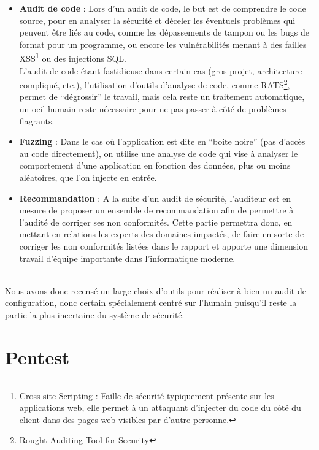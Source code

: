 \documentclass[a4paper]{memoir}
\begin{document}
\begin{itemize}
\item \textbf{Audit de code} : Lors d'un audit de code, le but est de comprendre le code source, pour en analyser la sécurité et déceler les éventuels problèmes qui peuvent être liés au code, comme les dépassements de tampon ou les bugs de format pour un programme, ou encore les vulnérabilités menant à des failles XSS\footnote{Cross-site Scripting : Faille de sécurité typiquement présente sur les applications web, elle permet à un attaquant d'injecter du code du côté du client dans des pages web visibles par d'autre personne.} ou des injections SQL.\\
\noindent L'audit de code étant fastidieuse dans certain cas (gros projet, architecture compliqué, etc.), l'utilisation d'outils d'analyse de code, comme RATS\footnote{Rought Auditing Tool for Security}, permet de ``dégrossir'' le travail, mais cela reste un traitement automatique, un oeil humain reste nécessaire pour ne pas passer à côté de problèmes flagrants.\\

\item \textbf{Fuzzing} : Dans le cas où l'application est dite en ``boite noire'' (pas d'accès au code directement), on utilise une analyse de code qui vise à analyser le comportement d'une application en fonction des données, plus ou moins aléatoires, que l'on injecte en entrée.\\

\item \textbf{Recommandation} : A la suite d'un audit de sécurité, l'auditeur est en mesure de proposer un ensemble de recommandation afin de permettre à l'audité de corriger ses non conformités. Cette partie permettra donc, en mettant en relations les experts des domaines impactés, de faire en sorte de corriger les non conformités listées dans le rapport et apporte une dimension travail d'équipe importante dans l'informatique moderne.\\\\
\end{itemize}

Nous avons donc recensé un large choix d'outils pour réaliser à bien un audit de configuration, donc certain spécialement centré sur l'humain puisqu'il reste la partie la plus incertaine du système de sécurité.\\
\chapter{Pentest}
\end{document}
